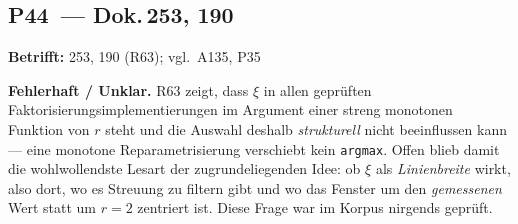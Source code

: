 \medskip

\subsection*{P44~--- Dok.\,253, 190}

\noindent\textbf{Betrifft:} 253, 190 (R63); vgl.\ A135, P35

\smallskip\noindent\textbf{Fehlerhaft / Unklar.}\quad
R63 zeigt, dass $\xi$ in allen geprüften Faktorisierungsimplementierungen
im Argument einer streng monotonen Funktion von $r$ steht und die Auswahl
deshalb \emph{strukturell} nicht beeinflussen kann --- eine monotone
Reparametrisierung verschiebt kein \texttt{argmax}. Offen blieb damit die
wohlwollendste Lesart der zugrundeliegenden Idee: ob $\xi$ als
\emph{Linienbreite} wirkt, also dort, wo es Streuung zu filtern gibt und wo
das Fenster um den \emph{gemessenen} Wert statt um $r = 2$ zentriert ist.
Diese Frage war im Korpus nirgends geprüft.

